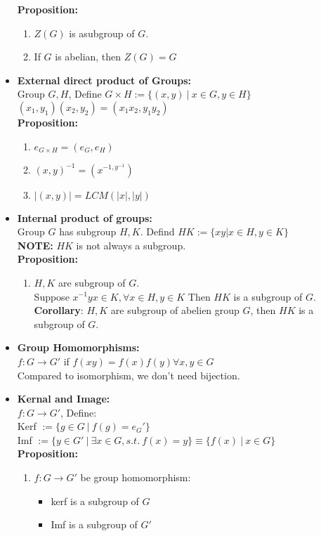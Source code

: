 \documentclass[12pt]{article}
\begin{document}
\begin{itemize}
        \textbf{Proposition:}
        \begin{enumerate}
            \item $Z(G)$ is asubgroup of $G$.
            \item If $G$ is abelian, then $Z(G) = G$
        \end{enumerate}
        \item \textbf{External direct product of Groups:}\\
        Group $G, H$, Define $G \times H :=\{(x,y) \ | \ x\in G, y \in H\}$\\
        $(x_1,y_1)(x_2, y_2) = (x_1x_2, y_1y_2)$\\
        \textbf{Proposition:}
        \begin{enumerate}
            \item $e_{G\times H} = (e_G, e_H)$
            \item $(x,y)^{-1} = (x^{-1, y^{-1}})$
            \item $|(x,y)| = LCM(|x|, |y|)$
        \end{enumerate}
        \item \textbf{Internal product of groups:}\\
        Group $G$ has subgroup $H, K$. Defind $HK:=\{xy | x\in H, y \in K\}$\\
        \textbf{NOTE:} $HK$ is not always a subgroup.\\
        \textbf{Proposition:}
        \begin{enumerate}
            \item $H,K$ are subgroup of $G$. \\
            Suppose $x^{-1}yx\in K, \forall x\in H, y \in K$ Then $HK$ is a subgroup of $G$.\\
            \textbf{Corollary}: $H,K$ are subgroup of abelien group $G$, then $HK$ is a subgroup of $G$.
        \end{enumerate}
        \item \textbf{Group Homomorphisms:}\\
        $f: G \rightarrow G'$ if $f(xy) = f(x)f(y) \forall x,y \in G$\\
        Compared to isomorphism, we don't need bijection.
        \item \textbf{Kernal and Image:}\\
        $f: G \rightarrow G'$, Define:\\
        Kerf $:=\{g \in G \ | \ f(g) = e_G'\}$\\
        Imf $:= \{y \in G' \ | \ \exists x \in G, s.t. \ f(x) = y\} \equiv \{f(x) \ | \ x\in G\}$\\
        \textbf{Proposition:}
        \begin{enumerate}
            \item $f: G \rightarrow G'$ be group homomorphism:
            \begin{itemize}
                \item kerf is a subgroup of $G$
                \item Imf is a subgroup of $G'$
            \end{itemize}
        \end{enumerate}
    \end{itemize}
\end{document}

